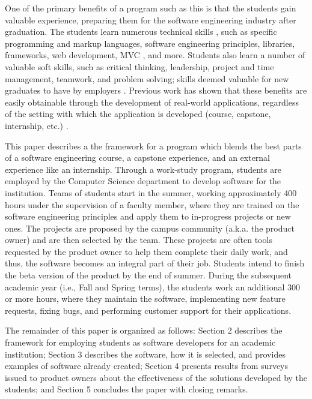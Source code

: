 One of the primary benefits of a program such as this is that the students gain valuable experience, preparing them for the software engineering industry after graduation. The students learn numerous technical skills \cite{hardskills}, such as specific programming and markup languages, software engineering principles, libraries, frameworks, web development, MVC \cite{mvc}, and more. Students also learn a number of valuable soft skills, such as critical thinking, leadership, project and time management, teamwork, and problem solving; skills deemed valuable for new graduates to have by employers \cite{lavy2013soft}. Previous work has shown that these benefits are easily obtainable through the development of real-world applications, regardless of the setting with which the application is developed (course, capstone, internship, etc.) \cite{heggen2018hiring, liu2005enriching, alzamil2005towards}.

This paper describes a the framework for a program which blends the best parts of a software engineering course, a capstone experience, and an external experience like an internship. Through a work-study program, students are employed by the Computer Science department to develop software for the institution. Teams of students start in the summer, working approximately 400 hours under the supervision of a faculty member, where they are trained on the software engineering principles and apply them to in-progress projects or new ones. The projects are proposed by the campus community (a.k.a. the product owner) and are then selected by the team. These projects are often tools requested by the product owner to help them complete their daily work, and thus, the software becomes an integral part of their job. Students intend to finish the beta version of the product by the end of summer. During the subsequent academic year (i.e., Fall and Spring terms), the students work an additional 300 or more hours, where they maintain the software, implementing new feature requests, fixing bugs, and performing customer support for their applications. 

The remainder of this paper is organized as follows: Section 2 describes the framework for employing students as software developers for an academic institution; Section 3 describes the software, how it is selected, and provides examples of software already created; Section 4 presents results from surveys issued to product owners about the effectiveness of the solutions developed by the students; and Section 5 concludes the paper with closing remarks. 
